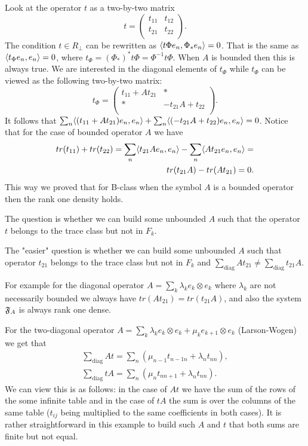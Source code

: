 \documentclass[12pt]{amsart}
\theoremstyle{case}
\begin{document}
    Look at the operator $t$ as a two-by-two matrix
    \[
      t = \left({
            \begin{array}{cc}
              t_{11} &t_{12}\\
              t_{21} &t_{22}\\
            \end{array}
            }
          \right).
    \]
    The condition $t \in R_\perp$ can be rewritten as $ \langle t\Phi e_n, \Phi_* e_n \rangle = 0$.
    That is the same as $\langle t_{\Phi}e_n, e_n \rangle = 0$, where $t_{\Phi} = (\Phi_*)^* t \Phi = \Phi^{-1} t \Phi$.
    When $A$ is bounded then this is always true.
    We are interested in the diagonal elements of $t_\Phi$ while $t_\Phi$ can be viewed as the following two-by-two matrix:
    \[
      t_\Phi = \left({
               \begin{array}{cc}
                 t_{11} + At_{21} & *\\
                 * & -t_{21}A + t_{22}\\
               \end{array}
             }
             \right).
    \]
    It follows that $\sum_n \langle (t_{11} + At_{21}) e_n, e_n \rangle + \sum_n \langle (-t_{21}A + t_{22})e_n, e_n \rangle = 0$.
    Notice that for the case of bounded operator $A$ we have
    \begin{align*}
      tr(t_{11}) + tr(t_{22}) = \sum_n \langle t_{21}A e_n, e_n \rangle - \sum_n \langle At_{21} e_n, e_n \rangle =\\
        tr(t_{21}A) - tr(At_{21}) = 0.
    \end{align*}
    This way we proved that for B-class when the symbol $A$ is a bounded operator then the rank one density holds.

    The question is whether we can build some unbounded $A$ such that the operator $t$ belongs to the trace class
      but not in $F_k$.

    The "easier" question is whether we can build some unbounded $A$ such that operator $t_{21}$ belongs to the trace class
      but not in $F_k$ and $\sum_{\text{diag}}At_{21} \neq \sum_{\text{diag}}t_{21}A$.

    For example for the diagonal operator $A = \sum_k \lambda_k e_k \otimes e_k$ where $\lambda_k$ are not necessarily bounded
      we always have $tr(At_{21}) = tr(t_{21}A)$,
      and also the system $\mathfrak{F}_A$ is always rank one dense.

    For the two-diagonal operator $A = \sum_k \lambda_k e_k \otimes e_k + \mu_k e_{k + 1} \otimes e_k$ (Larson-Wogen) we get that
    \begin{align*}
      \sum_{\text{diag}} At = \sum_n (\mu_{n-1} t_{n-1 n} + \lambda_n t_{nn}),\\
      \sum_{\text{diag}} tA = \sum_n (\mu_n t_{n n+1} + \lambda_n t_{nn}).
    \end{align*}
    We can view this is as follows:
      in the case of $At$ we have the sum of the rows of the some infinite table and in the case of
      $tA$ the sum is over the columns of the same table ($t_{ij}$ being multiplied to the same coefficients in both cases).
    It is rather straightforward in this example to build such $A$ and $t$ that both sums are finite but not equal.
\end{document}
